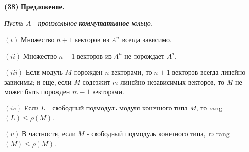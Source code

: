 	\noindent
	{\bf (38) Предложение.}
	
	{\it Пусть $A$ - произвольное {\bf коммутативное} кольцо.
		
	$(i)$ Множество $n + 1$ векторов из $A^n$ всегда зависимо.
	
	$(ii)$ Множество $n - 1$ векторов из $A^n$ не порождает $A^n$.
	
	$(iii)$ Если модуль $M$ порожден $n$ векторами, то $n + 1$ векторов всегда\linebreak
	линейно зависимы; и еще, если $M$ содержит $m$ линейно независимых\linebreak
	векторов, то $M$ не может быть порожден $m - 1$ векторами.
	
	$(iv)$ Если $L$ - свободный подмодуль модуля конечного типа $M$, то\linebreak
	rang$(L) \leqslant \rho(M)$.
	
	$(v)$ В частности, если $M$ - свободный подмодуль конечного типа,\linebreak
	то rang$(M) \leqslant \rho(M)$.}
	
	\pagebreak
	
	
